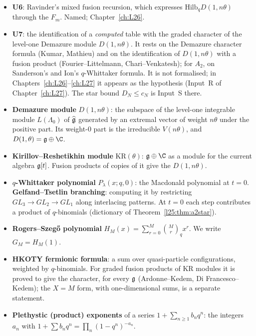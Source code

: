 \begin{itemize}
  $\le(\dim\ltwentyfiveg)^m$, with graded character $F_m$. Its published source for the total dimension is
  Kus--Littelmann, Pacific J.\ Math.\ 278, Theorem~4.2, with one flagged step (p.~437); Feigin's earlier proof has a
  gap (Chapter~\ref{ch:L27}). It is a named hypothesis, reduced in Chapter~\ref{ch:L26}.
\item \textbf{U6}: Ravinder's mixed fusion recursion, which expresses $\mathrm{Hilb}_qD(1,n\theta)$ through the
  $F_m$. Named; Chapter~\ref{ch:L26}.
\item \textbf{U7}: the identification of a \emph{computed} table with the graded character of the level-one Demazure
  module $D(1,n\theta)$. It rests on the Demazure character formula (Kumar, Mathieu) and on the identification of
  $D(1,n\theta)$ with a fusion product (Fourier--Littelmann, Chari--Venkatesh); for $A_2$, on Sanderson's and Ion's
  $q$-Whittaker formula. It is not formalised; in Chapters~\ref{ch:L26}--\ref{ch:L27} it appears as the hypothesis
   (Input~R of Chapter~\ref{ch:L27}). The star bound $D_N\le c_N$ is Input~S there.
\item \textbf{Demazure module} $D(1,n\theta)$: the subspace of the level-one integrable module $L(\Lambda_0)$ of
  $\widehat{\mathfrak g}$ generated by an extremal vector of weight $n\theta$ under the positive part. Its
  weight-$0$ part is the irreducible $V(n\theta)$, and $D(1,\theta)=\ltwentyfiveg\oplus\C$.
\item \textbf{Kirillov--Reshetikhin module} $\mathrm{KR}(\theta)$: $\ltwentyfiveg\oplus\C$ as a module for the current
  algebra $\mathfrak g[t]$. Fusion products of copies of it give the $D(1,n\theta)$.
\item \textbf{$q$-Whittaker polynomial} $P_\lambda(x;q,0)$: the Macdonald polynomial at $t=0$. \textbf{Gelfand--Tsetlin
  branching}: computing it by restricting $GL_3\to GL_2\to GL_1$ along interlacing patterns. At $t=0$ each step
  contributes a product of $q$-binomials (dictionary of Theorem~\ref{l25:thm:a2star}).
\item \textbf{Rogers--Szeg\H{o} polynomial} $H_M(x)=\sum_{r=0}^M\binom Mr_qx^r$. We write $G_M=H_M(1)$.
\item \textbf{HKOTY fermionic formula}: a sum over quasi-particle configurations, weighted by $q$-binomials. For
  graded fusion products of KR modules it is proved to give the character, for every $\mathfrak g$ (Ardonne--Kedem,
  Di Francesco--Kedem); the $X=M$ form, with one-dimensional sums, is a separate statement.
\item \textbf{Plethystic (product) exponents} of a series $1+\sum_{n\ge1}b_nq^n$: the integers $a_n$ with
  $1+\sum b_nq^n=\prod_n(1-q^n)^{-a_n}$.
\end{itemize}

